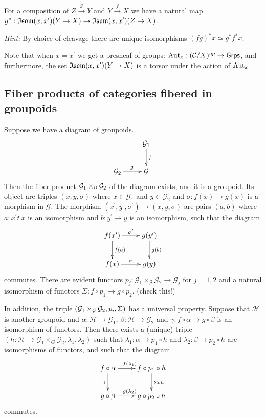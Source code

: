 \documentclass[11pt, english]{article}
\begin{document}
\begin{exc}
For a composition of $Z \xrightarrow{g} Y$ and $Y \xrightarrow{f} X$ we have a natural map $g^*:\mathfrak{Isom}(x,x^\prime)(Y \to X) \to \mathfrak{Isom}(x,x^\prime)(Z \to X)$.
\end{exc}
\begin{sol}
\emph{Hint:} By choice of cleavage there are unique isomorphisms $(fg)^\ast x \simeq g^\ast f^\ast x$.
\end{sol}

Note that when $x=x^\prime$ we get a presheaf of groups: $\operatorname{Aut}_x: (\mathcal{C}/X)^{op} \to \mathsf{Grps}$, and furthermore, the set $\mathfrak{Isom}(x,x^\prime)(Y \to X)$ is a torsor under the action of $\operatorname{Aut}_x$.

\subsection{Fiber products of categories fibered in groupoids}

Suppose we have a diagram of groupoids.
\[
\xymatrix{
 & \mathcal G_1 \ar[d]^f  \\
\mathcal G_2 \ar[r]^g & \mathcal G
}
\]
Then the fiber product $\mathcal G_1 \times_{\mathcal G} \mathcal G_2$ of the diagram exists, and it is a groupoid. Its object are triples $(x,y,\sigma)$ where $x \in \mathcal G_1$ and $y \in \mathcal G_2$ and $\sigma:f(x) \to g(x)$ is a morphism in $\mathcal G$. The morphism $(x^\prime,y^\prime, \sigma^\prime) \to (x,y,\sigma)$ are pairs $(a,b)$ where $a:x^\prime t\ x$ is an isomorphism and $b:y^\prime \to y$ is an isomorphism, such that the diagram 
\[
\xymatrix{
f(x^\prime) \ar[r]^{\sigma^\prime} \ar[d]^{f(a)} & g(y^\prime) \ar[d]^{g(b)} \\
f(x) \ar[r]^\sigma & g(y) 
}
\]
commutes. There are evident functors $p_j:\mathcal G_1 \times_{\mathcal G} \mathcal G_2 \to \mathcal G_j$ for $j=1,2$ and a natural isomorphism of functors $\Sigma:f \circ p_1 \to g \circ p_2$. (check this!)

In addition, the triple $(\mathcal G_1 \times_{\mathcal G} \mathcal G_2, p_i, \Sigma)$ has a universal property. Suppose that $\mathcal H$ is another groupoid and $\alpha:\mathcal H \to \mathcal G_1$, $\beta:\mathcal H \to \mathcal G_2$ and $\gamma:f \circ \alpha \to g \circ \beta$ is an isomorphism of functors. Then there exists a (unique) triple $(h: \mathcal H \to \mathcal G_1 \times_G \mathcal G_2, \lambda_1, \lambda_2)$ such that $\lambda_1: \alpha \to p_1 \circ h$ and $\lambda_2: \beta \to p_2 \circ h$ are isomorphisms of functors, and such that the diagram
\[
\xymatrix{
f \circ \alpha \ar[r]^{f(\lambda_1)} \ar[d]_\gamma & f \circ p_1 \circ h \ar[d]^{\Sigma \circ h} \\
g \circ \beta \ar[r]^{g(\lambda_2)} & g \circ p_2 \circ h 
}
\]
commutes.
\end{document}
